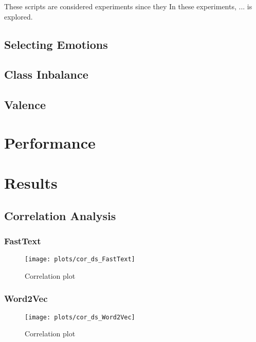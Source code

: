 These scripts are considered experiments since they
In these experiments, ... is explored.


\subsection{Selecting Emotions}\label{sub:Selecting Emotions}
\subsection{Class Inbalance}\label{sub:Class Inbalance}
\subsection{Valence}\label{sub:Valence}





\section{Performance}\label{sec:Performance}

\section{Results}\label{sec:Results}
\subsection{Correlation Analysis}\label{sub:Correlation Analysis}

\subsubsection{FastText}
\begin{figure}[H]
  \texttt{[image: plots/cor\_ds\_FastText]}
  \centering
  \caption{Correlation plot}
\end{figure}\label{fig:cor_ds_FastText}

\subsubsection{Word2Vec}
\begin{figure}[H]
  \texttt{[image: plots/cor\_ds\_Word2Vec]}
  \centering
  \caption{Correlation plot}
\end{figure}\label{fig:cor_ds_Word2Vec}

